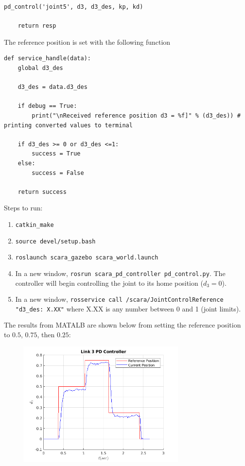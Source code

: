 \documentclass[10pt]{article}
\begin{document}
\begin{enumerate}
\begin{lstlisting}[style=Matlab-editor,basicstyle=\mlttfamily,escapechar=`]
	pd_control('joint5', d3, d3_des, kp, kd)
	
	return resp
\end{lstlisting} 

	The reference position is set with the following function
	
\begin{lstlisting}[style=Matlab-editor,basicstyle=\mlttfamily,escapechar=`]
def service_handle(data):
	global d3_des
	
	d3_des = data.d3_des
	
	if debug == True:
		print("\nReceived reference position d3 = %f]" % (d3_des)) # printing converted values to terminal
	
	if d3_des >= 0 or d3_des <=1:
		success = True
	else:
		success = False
	
	return success
\end{lstlisting} 

	Steps to run:
	
	\begin{enumerate}
		\item \texttt{catkin\_make}
		\item \texttt{source devel/setup.bash}
		\item \texttt{roslaunch scara\_gazebo scara\_world.launch}
		\item In a new window, \texttt{rosrun scara\_pd\_controller pd\_control.py}. The controller will begin controlling the joint to its home position ($d_3 = 0$).
		\item In a new window, \texttt{rosservice call /scara/JointControlReference "d3\_des: X.XX"} where X.XX is any number between 0 and 1 (joint limits).
	\end{enumerate}


	The results from MATALB are shown below from setting the reference position to $0.5$, $0.75$, then $0.25$:

	\begin{figure}[H]
		\centering
		\includegraphics[width=0.75\textwidth]{figures/link_3_pd_plot1.png}
	\end{figure}
	

\end{enumerate}
\end{document}
